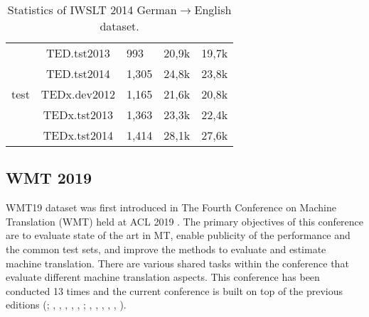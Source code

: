 \begin{table}[h]
\begin{tabular}{@{}cclll@{}}
        \multirow{5}{*}{test}                             & TED.tst2013                                             & 993                                 & 20,9k                           & 19,7k \\
                                                          & TED.tst2014                                             & 1,305                               & 24,8k                           & 23,8k \\
                                                          & TEDx.dev2012                                            & 1,165                               & 21,6k                           & 20,8k \\
                                                          & TEDx.tst2013                                            & 1,363                               & 23,3k                           & 22,4k \\
                                                          & TEDx.tst2014                                            & 1,414                               & 28,1k                           & 27,6k \\ \bottomrule
    \end{tabular}
    \caption{Statistics of IWSLT 2014 German$\rightarrow$English dataset.}
    \label{tab:iwslt14stat}
\end{table}

\subsection{WMT 2019}
WMT19 dataset was first introduced in The Fourth Conference on Machine Translation (WMT) held at ACL 2019 \cite{barrault-etal-2019-findings}. The primary objectives of this conference are to evaluate state of the art in MT, enable publicity of the performance and the common test sets, and improve the methods to evaluate and estimate machine translation. There are various shared tasks within the conference that evaluate different machine translation aspects. This conference has been conducted 13 times and the current conference is built on top of the previous editions (\cite{koehn-monz-2006-manual}; \cite{callison-burch-etal-2007-meta}, \cite{callison-burch-etal-2008-meta}, \cite{callison-burch-etal-2009-findings}, \cite{callison-burch-etal-2010-findings}, \cite{callison-burch-etal-2011-findings}, \cite{callison-burch-etal-2012-findings}; \cite{bojar-etal-2013-findings}, \cite{bojar-etal-2014-findings}, \cite{bojar-etal-2015-findings}, \cite{bojar-etal-2016-findings}, \cite{bojar-etal-2017-findings}, \cite{bojar-etal-2018-findings}).

